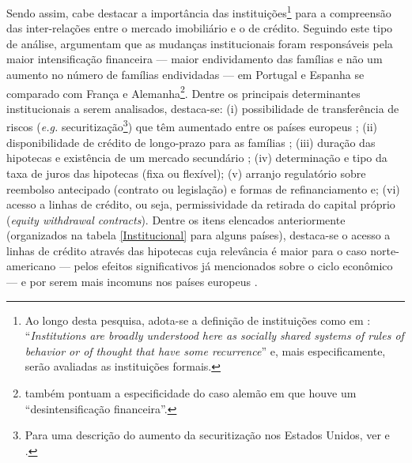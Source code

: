 Sendo assim, cabe destacar a importância das instituições\footnote{
	Ao longo desta pesquisa, adota-se a definição de instituições como em 	\textcite[p.~85]{dequech_economic_2013}: ``\textit{Institutions are broadly understood here as socially shared systems of rules of behavior or of thought that have some recurrence}'' e, mais especificamente, serão avaliadas as instituições formais.} 
para a compreensão das inter-relações entre o mercado imobiliário e o de crédito.  
Seguindo este tipo de análise, \textcite{van_gunten_varieties_2018} argumentam que as mudanças institucionais foram responsáveis pela maior intensificação financeira --- maior endividamento das famílias e não um aumento no número de famílias endividadas --- em Portugal e Espanha se comparado com França e Alemanha\footnote{\textcite[p.~92]{van_gunten_varieties_2018} também pontuam a especificidade do caso alemão em que houve um ``desintensificação financeira''.}. Dentre os principais determinantes institucionais a serem analisados, destaca-se: (i) possibilidade de transferência de riscos (\textit{e.g.} securitização\footnote{Para uma descrição do aumento da securitização nos Estados Unidos, ver \textcite{green_american_2005} e \textcite{cagnin_o_2009}.}) que têm aumentado entre os países europeus \cite{european_central_bank_housing_2010}; (ii) disponibilidade de crédito de longo-prazo para as famílias \cite{schwartz_politics_2009}; (iii) duração das hipotecas e existência de um mercado secundário \cite{green_american_2005}; (iv) determinação  e tipo da taxa de juros das hipotecas (fixa ou flexível); (v) arranjo regulatório sobre reembolso antecipado (contrato ou legislação) e formas de refinanciamento e; (vi) acesso a linhas de crédito, ou seja, permissividade da retirada do capital próprio (\textit{equity withdrawal contracts}). Dentre os itens elencados anteriormente (organizados na tabela \ref{Institucional} para alguns países), destaca-se o acesso a linhas de crédito através das hipotecas cuja relevância é maior para o caso norte-americano --- pelos efeitos significativos já mencionados sobre o ciclo econômico --- e por serem mais incomuns nos países europeus \cite[p.~95]{van_gunten_varieties_2018}.

